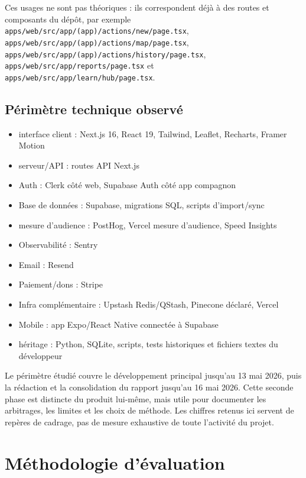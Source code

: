 \documentclass[
  10pt,
  a4paper,
  DIV=11,
  numbers=noendperiod,
  oneside]{scrreprt}
\providecommand{\tightlist}{%
  \setlength{\itemsep}{0pt}\setlength{\parskip}{0pt}}
\begin{document}
Ces usages ne sont pas théoriques : ils correspondent déjà à des routes
et composants du dépôt, par exemple
\texttt{apps/web/src/app/(app)/actions/new/page.tsx},
\texttt{apps/web/src/app/(app)/actions/map/page.tsx},
\texttt{apps/web/src/app/(app)/actions/history/page.tsx},
\texttt{apps/web/src/app/reports/page.tsx} et
\texttt{apps/web/src/app/learn/hub/page.tsx}.

\subsection{Périmètre technique
observé}\label{puxe9rimuxe8tre-technique-observuxe9}

\begin{itemize}
\tightlist
\item
  interface client : Next.js 16, React 19, Tailwind, Leaflet, Recharts,
  Framer Motion
\item
  serveur/API : routes API Next.js
\item
  Auth : Clerk côté web, Supabase Auth côté app compagnon
\item
  Base de données : Supabase, migrations SQL, scripts d'import/sync
\item
  mesure d'audience : PostHog, Vercel mesure d'audience, Speed Insights
\item
  Observabilité : Sentry
\item
  Email : Resend
\item
  Paiement/dons : Stripe
\item
  Infra complémentaire : Upstash Redis/QStash, Pinecone déclaré, Vercel
\item
  Mobile : app Expo/React Native connectée à Supabase
\item
  héritage : Python, SQLite, scripts, tests historiques et fichiers
  textes du développeur
\end{itemize}

Le périmètre étudié couvre le développement principal jusqu'au 13 mai
2026, puis la rédaction et la consolidation du rapport jusqu'au 16 mai
2026. Cette seconde phase est distincte du produit lui-même, mais utile
pour documenter les arbitrages, les limites et les choix de méthode. Les
chiffres retenus ici servent de repères de cadrage, pas de mesure
exhaustive de toute l'activité du projet.

\section{Méthodologie
d'évaluation}\label{muxe9thodologie-duxe9valuation}
\end{document}
